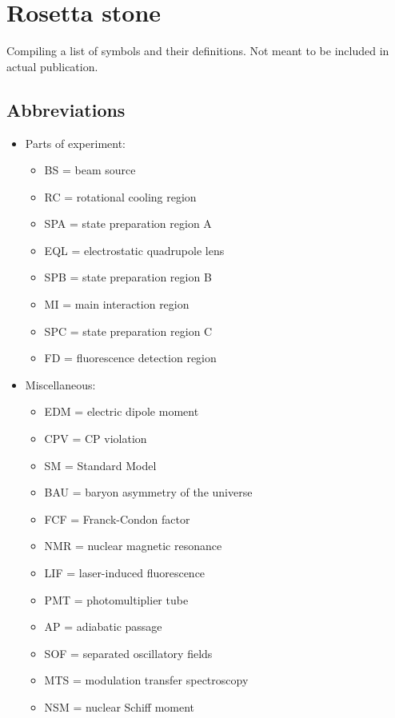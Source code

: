 \section{Rosetta stone}
Compiling a list of symbols and their definitions. Not meant to be included in actual publication.

\subsection{Abbreviations}
\begin{itemize}
    \item Parts of experiment:
    \begin{itemize}
        \item BS = beam source
        \item RC = rotational cooling region
        \item SPA = state preparation region A
        \item EQL = electrostatic quadrupole lens
        \item SPB = state preparation region B
        \item MI = main interaction region
        \item SPC = state preparation region C
        \item FD = fluorescence detection region
    \end{itemize}
    
    \item Miscellaneous:
    \begin{itemize}
        \item EDM = electric dipole moment
        \item CPV = CP violation
        \item SM = Standard Model
        \item BAU = baryon asymmetry of the universe
        \item FCF = Franck-Condon factor
        \item NMR = nuclear magnetic resonance
        \item LIF = laser-induced fluorescence
        \item PMT = photomultiplier tube
        \item AP = adiabatic passage
        \item SOF = separated oscillatory fields
        \item MTS = modulation transfer spectroscopy
        \item NSM = nuclear Schiff moment
    \end{itemize}
    
\end{itemize}

